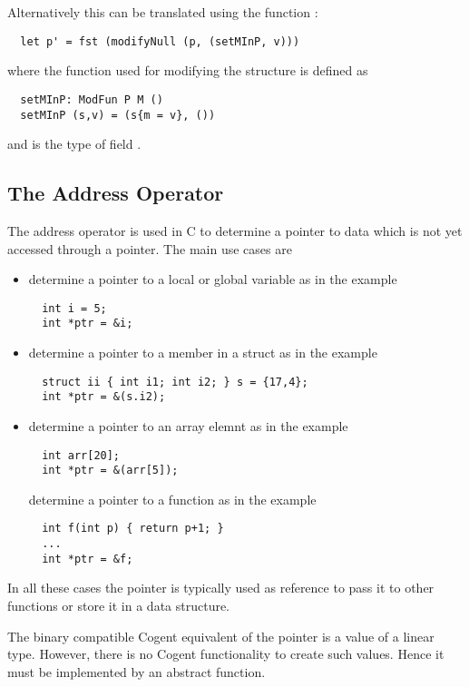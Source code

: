 Alternatively this can be translated using the function :
\begin{verbatim}
  let p' = fst (modifyNull (p, (setMInP, v)))
\end{verbatim}
where the function used for modifying the structure is defined as
\begin{verbatim}
  setMInP: ModFun P M ()
  setMInP (s,v) = (s{m = v}, ())
\end{verbatim}
and  is the type of field .

\subsection{The Address Operator \code{\&}}
\label{app-transfunction-addrop}

The address operator \code{\&} is used in C to determine a pointer to data which is not yet accessed through a 
pointer. The main use cases are
\begin{itemize}
\item determine a pointer to a local or global variable as in the example
\begin{verbatim}
  int i = 5;
  int *ptr = &i;
\end{verbatim}

\item determine a pointer to a member in a struct as in the example
\begin{verbatim}
  struct ii { int i1; int i2; } s = {17,4};
  int *ptr = &(s.i2);
\end{verbatim}

\item determine a pointer to an array elemnt as in the example
\begin{verbatim}
  int arr[20];
  int *ptr = &(arr[5]);
\end{verbatim}

determine a pointer to a function as in the example
\begin{verbatim}
  int f(int p) { return p+1; }
  ...
  int *ptr = &f;
\end{verbatim}
\end{itemize}

In all these cases the pointer is typically used as reference to pass it to other functions or store it
in a data structure.

The binary compatible Cogent equivalent of the pointer is a value of a linear type. However, there is
no Cogent functionality to create such values. Hence it must be implemented by an abstract function.

